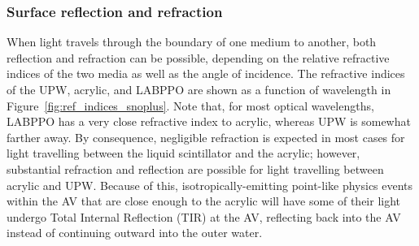 \subsubsection{Surface reflection and refraction}
When light travels through the boundary of one medium to another, both reflection and refraction can be possible, depending on the relative refractive indices of the two media as well as the angle of incidence. The refractive indices of the UPW, acrylic, and LABPPO are shown as a function of wavelength in Figure~\ref{fig:ref_indices_snoplus}. Note that, for most optical wavelengths, LABPPO has a very close refractive index to acrylic, whereas UPW is somewhat farther away. By consequence, negligible refraction is expected in most cases for light travelling between the liquid scintillator and the acrylic; however, substantial refraction and reflection are possible for light travelling between acrylic and UPW. Because of this, isotropically-emitting point-like physics events within the AV that are close enough to the acrylic will have some of their light undergo Total Internal Reflection (TIR) at the AV, reflecting back into the AV instead of continuing outward into the outer water.


